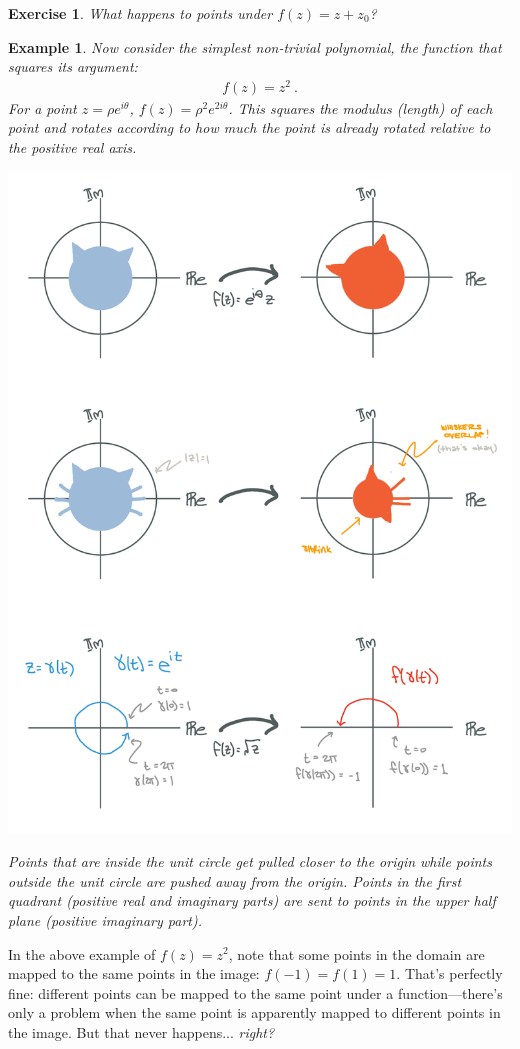 \documentclass[
  11pt,
	colorful,
	raggedright,
]{tufte-style-thesis-flip}
\newtheorem{exercise}{Exercise}[section]
\newtheorem{example}{Example}[section]
\begin{document}
\begin{exercise}
What happens to points under $f(z) = z+ z_0$?
\end{exercise}


\begin{example}
Now consider the simplest non-trivial polynomial, the function that squares its argument:
\begin{align}
  f(z) =  z^2 \ .
\end{align}
For a point $z = \rho e^{i\theta}$, $f(z)  = \rho^2 e^{2i\theta}$. This squares the modulus (length) of each point and rotates according to how much the point is already rotated relative to the positive real axis.
\begin{center}
\includegraphics[width=.7\textwidth]{figures/Complex_03_sq.pdf}
\end{center}
Points that are inside the unit circle get pulled closer to the origin while points outside the unit circle are pushed away from the origin.  Points in the first quadrant (positive real and imaginary parts) are sent to points in the upper half plane (positive imaginary part).
\end{example}

In the above example of $f(z)= z^2$, note that some points in the domain are mapped to the same points in the image: $f(-1) = f(1) = 1$. That's perfectly fine: different points can be mapped to the same point under a function---there's only a problem when the same point is apparently mapped to different points in the image. But that never happens... \emph{right?}
\end{document}
